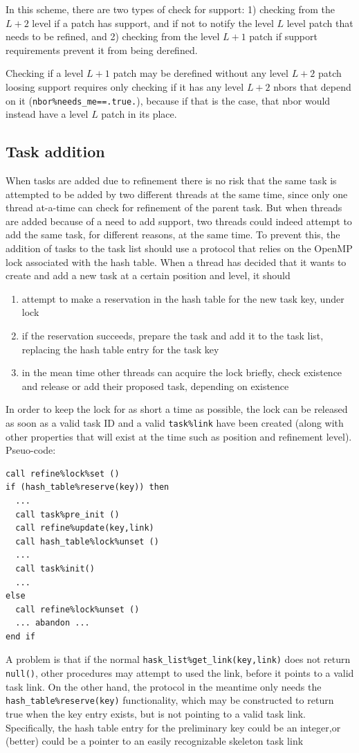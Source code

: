 \documentclass[paper=a4,fontsize=11pt]{scrartcl}
\numberwithin{equation}{section}		%
\numberwithin{figure}{section}			%
\numberwithin{table}{section}				%
\newcommand{\codecolor}{\color{Blue}}
\newcommand{\Code}[1]{{\codecolor\texttt{#1}}}
\begin{document}
In this scheme, there are two types of check for support: 1) checking from the $L+2$ level if a patch has support, and if not to notify the level $L$ level patch that needs to be refined, and 2) checking from the level $L+1$ patch if support requirements prevent it from being derefined.

Checking if a level $L+1$ patch may be derefined without any level $L+2$ patch loosing support requires only checking if it has any level $L+2$ nbors that depend on it (\Code{nbor\%needs\_me==.true.}), because if that is the case, that nbor would instead have a level $L$ patch in its place. 
\subsection{Task addition}
When tasks are added due to refinement there is no risk that the same task is attempted to be added by two different threads at the same time, since only one thread at-a-time can check for refinement of the parent task.   But when threads are added because of a need to add support, two threads could indeed attempt to add the same task, for different reasons, at the same time.   To prevent this, the addition of tasks to the task list should use a protocol that relies on the OpenMP lock associated with the hash table.  When a thread has decided that it wants to create and add a new task at a certain position and level, it should
\begin{enumerate}
    \item attempt to make a reservation in the hash table for the new task key, under lock
    \item if the reservation succeeds, prepare the task and add it to the task list, replacing the hash table entry for the task key
    \item in the mean time other threads can acquire the lock briefly, check existence and release or add their proposed task, depending on existence
\end{enumerate}
In order to keep the lock for as short a time as possible, the lock can be released as soon as a valid task ID and a valid \verb|task%link| have been created (along with other properties that will exist at the time such as position and refinement level).  Pseuo-code:
{\small\codecolor\begin{verbatim}
call refine%lock%set ()
if (hash_table%reserve(key)) then
  ...
  call task%pre_init ()
  call refine%update(key,link)
  call hash_table%lock%unset ()
  ...
  call task%init()
  ...
else
  call refine%lock%unset ()
  ... abandon ...
end if
\end{verbatim}}
A problem is that if the normal \verb|hask_list%get_link(key,link)| does not return \verb|null()|, other procedures may attempt to used the link, before it points to a valid task link.  On the other hand, the protocol in the meantime only needs the \verb|hash_table%reserve(key)| functionality, which may be constructed to return true when the key entry exists, but is not pointing to a valid task link.   Specifically, the hash table entry for the preliminary key could be an integer,or (better) could be a pointer to an easily recognizable skeleton task link
\end{document}
